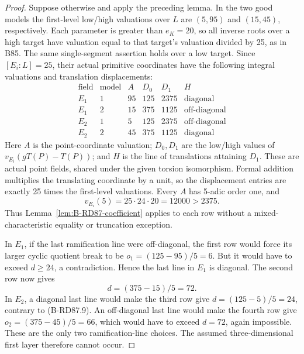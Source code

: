 \begin{proof}
Suppose otherwise and apply the preceding lemma.
In the two good models the first-level low/high
valuations over \(L\) are \((5,95)\) and
\((15,45)\), respectively. Each parameter is
greater than \(e_K=20\), so all inverse roots over
a high target have valuation equal to that
target's valuation divided by 25, as in B85.
The same single-segment assertion holds over a
low target. Since \([E_i:L]=25\), their actual
primitive coordinates have the following
integral valuations and translation displacements:
\[
\begin{array}{c|c|r|r|r|c}
 \text{field}&\text{model}&A&D_0&D_1&H\\\hline
 E_1&1&95&125&2375&\text{diagonal}\\
 E_1&2&15&375&1125&\text{off-diagonal}\\
 E_2&1&5&125&2375&\text{off-diagonal}\\
 E_2&2&45&375&1125&\text{diagonal}
\end{array}                                             \tag{B-RD87.7}
\]
Here \(A\) is the point-coordinate valuation;
\(D_0,D_1\) are the low/high values of
\(v_{E_i}(gT(P)-T(P))\); and \(H\) is the line
of translations attaining \(D_1\). These are
actual point fields, shared under the given
torsion isomorphism. Formal addition multiplies
the translating coordinate by a unit, so the
displacement entries are exactly 25 times the
first-level valuations. Every \(A\) has
5-adic order one, and
\[
           v_{E_i}(5)=25\cdot24\cdot20=12000>2375.
                                                        \tag{B-RD87.8}
\]
Thus Lemma~\ref{lem:B-RD87-coefficient} applies to
each row without a mixed-characteristic equality
or truncation exception.

In \(E_1\), if the last ramification line were
off-diagonal, the first row would force its
larger cyclic quotient break to be
\(o_1=(125-95)/5=6\). But it would have to
exceed \(d\ge24\), a contradiction. Hence the
last line in \(E_1\) is diagonal. The second
row now gives
\[
                         d=(375-15)/5=72.             \tag{B-RD87.9}
\]
In \(E_2\), a diagonal last line would make
the third row give \(d=(125-5)/5=24\), contrary
to (B-RD87.9). An off-diagonal last line would
make the fourth row give
\(o_2=(375-45)/5=66\), which would have to
exceed \(d=72\), again impossible. These are
the only two ramification-line choices. The
assumed three-dimensional first layer therefore
cannot occur.
\end{proof}

